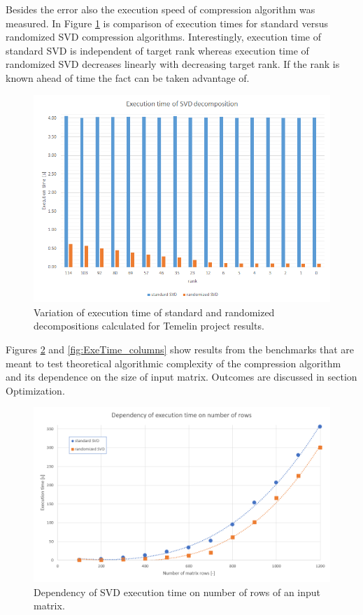 Besides the error also the execution speed of compression algorithm was measured. In Figure \ref{fig:temelin:ExeTime} is comparison of execution times for standard versus randomized SVD compression algorithms. Interestingly, execution time of standard SVD is independent of target rank whereas execution time of randomized SVD decreases linearly with decreasing target rank. If the rank is known ahead of time the fact can be taken advantage of.

\begin{figure}[H]
\centering\includegraphics[width=\textwidth]{figures/temelin_ExecutionTime}
\caption{Variation of execution time of standard and randomized decompositions calculated for Temelin project results.}
\label{fig:temelin:ExeTime}
\end{figure}

Figures \ref{fig:ExeTime_rows} and \ref{fig:ExeTime_columns} show results from the benchmarks that are meant to test theoretical algorithmic complexity of the compression algorithm and its dependence on the size of input matrix. Outcomes are discussed in section Optimization.

\begin{figure}[H]
\centering\includegraphics[width=\textwidth]{figures/executionTime_varyingRows}
\caption{Dependency of SVD execution time on number of rows of an input matrix.}
\label{fig:ExeTime_rows}
\end{figure}

